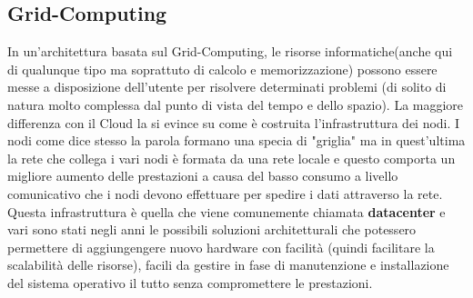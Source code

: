 \subsection{Grid-Computing}
In un'architettura basata sul Grid-Computing, le risorse informatiche(anche qui di qualunque tipo ma soprattuto di calcolo e memorizzazione) possono essere messe a disposizione dell'utente per risolvere determinati problemi (di solito di natura molto complessa dal punto di vista del tempo e dello spazio). La maggiore differenza con il Cloud la si evince su come è costruita l'infrastruttura dei nodi. I nodi come dice stesso la parola formano una specia di "griglia" ma in quest'ultima la rete che collega i vari nodi è formata da una rete locale e questo comporta un migliore aumento delle prestazioni a causa del basso consumo a livello comunicativo che i nodi devono effettuare per spedire i dati attraverso la rete. Questa infrastruttura è quella che viene comunemente chiamata \textbf{datacenter} e vari sono stati negli anni le possibili soluzioni architetturali che potessero permettere di aggiungengere nuovo hardware con facilità (quindi facilitare la scalabilità delle risorse), facili da gestire in fase di manutenzione e installazione del sistema operativo il tutto senza compromettere le prestazioni. 
